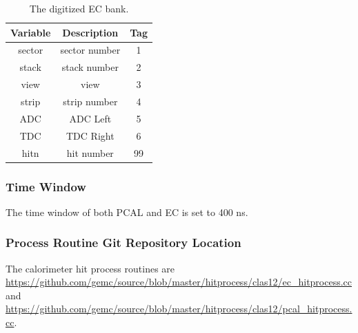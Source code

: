 \begin{table}[h]
	\begin{center}
		\begin{tabular}{| c | c | c |}
			\hline \hline
			Variable         & Description  & Tag  \\
			\hline
             sector  &                                     sector number  &    1 \\
              stack  &                                      stack number  &    2 \\
               view  &                                              view  &    3 \\
              strip  &                                      strip number  &    4 \\
                ADC  &                                          ADC Left  &    5 \\
                TDC  &                                         TDC Right  &    6 \\
               hitn  &                                        hit number  &   99 \\
			\hline \hline
		\end{tabular}
	\end{center}
	\caption{The digitized EC bank.}\label{tab:ecBank}
\end{table}


\subsubsection{Time Window}
The time window of both PCAL and EC is set to 400 ns.

\subsubsection{Process Routine Git Repository Location}
The calorimeter hit process routines are \url{https://github.com/gemc/source/blob/master/hitprocess/clas12/ec_hitprocess.cc} and
\url{https://github.com/gemc/source/blob/master/hitprocess/clas12/pcal_hitprocess.cc}.

